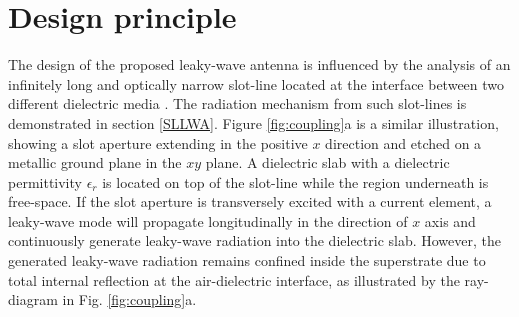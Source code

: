 \section{Design principle}
The design of the proposed leaky-wave antenna is influenced by the analysis of an infinitely long and optically narrow slot-line located at the interface between two different dielectric media \cite{Neto2003}\cite{Maci2004}. The radiation mechanism from such slot-lines is demonstrated in section \ref{SLLWA}. Figure \ref{fig:coupling}a is a similar illustration, showing a slot aperture extending in the positive $x$ direction and etched on a metallic ground plane in the $xy$ plane. A dielectric slab with a dielectric permittivity $\epsilon_r$ is located on top of the slot-line while the region underneath is free-space. If the slot aperture is transversely excited with a current element, a leaky-wave mode will propagate longitudinally in the direction of $x$ axis and continuously generate leaky-wave radiation into the dielectric slab. However, the generated leaky-wave radiation remains confined inside the superstrate due to total internal reflection at the air-dielectric interface, as illustrated by the ray-diagram in Fig. \ref{fig:coupling}a. 
%
